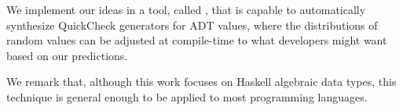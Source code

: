%
We implement our ideas in a tool, called {\dragenp}, that is capable to
automatically synthesize QuickCheck generators for ADT values, where the
distributions of random values can be adjusted at compile-time to what
developers might want based on our predictions.
%

We remark that, although this work focuses on Haskell algebraic data types, this
technique is general enough to be applied to most programming languages.


